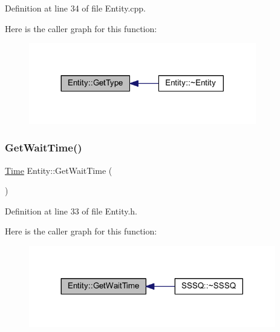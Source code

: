 Definition at line 34 of file Entity.\+cpp.

Here is the caller graph for this function\+:
\nopagebreak
\begin{figure}[H]
\begin{center}
\leavevmode
\includegraphics[width=281pt]{class_entity_a6618c119290b237bd6f9e903d029405d_icgraph}
\end{center}
\end{figure}
\mbox{\label{class_entity_ae3fc482f0412da20727709c6659c8768}} 
\subsubsection{\texorpdfstring{Get\+Wait\+Time()}{GetWaitTime()}}
{\footnotesize\ttfamily \hyperlink{_simulation_executive_8h_ac2d3e0ba793497bcca555c7c2cf64ff3}{Time} Entity\+::\+Get\+Wait\+Time (\begin{DoxyParamCaption}{ }\end{DoxyParamCaption})\hspace{0.3cm}{\ttfamily [inline]}}



Definition at line 33 of file Entity.\+h.

Here is the caller graph for this function\+:
\nopagebreak
\begin{figure}[H]
\begin{center}
\leavevmode
\includegraphics[width=305pt]{class_entity_ae3fc482f0412da20727709c6659c8768_icgraph}
\end{center}
\end{figure}
\mbox{\label{class_entity_ae05b43362e61b48a4a2ec5f629730029}} 
